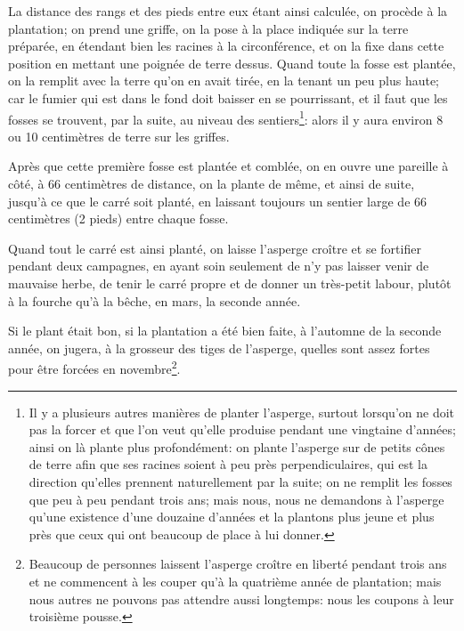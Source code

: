 \documentclass[10pt,a4paper]{book}
\begin{document}
La distance des rangs et des pieds entre eux étant ainsi calculée, on procède à la plantation; on prend une griffe, on la pose à la place indiquée sur la terre préparée, en étendant bien les racines à la circonférence, et on la fixe dans cette position en mettant une poignée de terre dessus. Quand toute la fosse est plantée, on la remplit avec la terre qu'on en avait tirée, en la tenant un peu plus haute; car le fumier qui est dans le fond doit baisser en se pourrissant, et il faut que les fosses se trouvent, par la suite, au niveau des sentiers\footnote{Il y a plusieurs autres manières de planter l'asperge, surtout lorsqu'on ne doit pas la forcer et que l'on veut qu'elle produise pendant une vingtaine d'années; ainsi on là plante plus profondément: on plante l'asperge sur de petits cônes de terre afin que ses racines soient à peu près perpendiculaires, qui est la direction qu'elles prennent naturellement par la suite; on ne remplit les fosses que peu à peu pendant trois ans; mais nous, nous ne demandons à l'asperge qu'une existence d'une douzaine d'années et la plantons plus jeune et plus près que ceux qui ont beaucoup de place à lui donner.}: alors il y aura environ 8 ou 10 centimètres de terre sur les griffes.

Après que cette première fosse est plantée et comblée, on en ouvre une pareille à côté, à 66 centimètres de distance, on la plante de même, et ainsi de suite, jusqu'à ce que le carré soit planté, en laissant toujours un sentier large de 66 centimètres (2 pieds) entre chaque fosse.

Quand tout le carré est ainsi planté, on laisse l'asperge croître et se fortifier pendant deux campagnes, en ayant soin seulement de n'y pas laisser venir de mauvaise herbe, de tenir le carré propre et de donner un très-petit labour, plutôt à la fourche qu'à la bêche, en mars, la seconde année.

Si le plant était bon, si la plantation a été bien faite, à l'automne de la seconde année, on jugera, à la grosseur des tiges de l'asperge, quelles sont assez fortes pour être forcées en novembre\footnote{Beaucoup de personnes laissent l'asperge croître en liberté pendant trois ans et ne commencent à les couper qu'à la quatrième année de plantation; mais nous autres ne pouvons pas attendre aussi longtemps: nous les coupons à leur troisième pousse.}.
\end{document}
